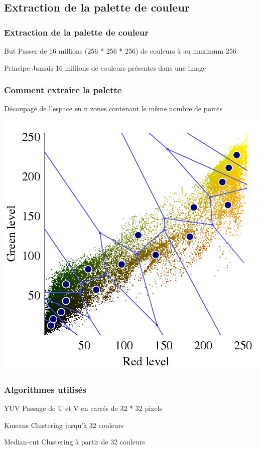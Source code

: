 \documentclass{beamer}
\begin{document}
\subsection{Extraction de la palette de couleur}
\begin{frame}
  \frametitle{Extraction de la palette de couleur}
  \begin{block}{But}
    Passer de 16 millions (256 * 256 * 256) de couleurs à au maximum 256
  \end{block}
  \begin{block}{Principe}
    Jamais 16 millions de couleurs présentes dans une image
  \end{block}
\end{frame}
\begin{frame}
  \frametitle{Comment extraire la palette}
  \begin{block}{}
    Découpage de l'espace en n zones contenant le même nombre de points
  \end{block}
  \begin{center}
    \includegraphics[scale=0.2]{cluster.png}
  \end{center}
\end{frame}
\begin{frame}
  \frametitle{Algorithmes utilisés}
  \begin{block}{YUV}
    Passage de U et V en carrés de 32 * 32 pixels
  \end{block}
  \begin{block}{Kmeans}
    Clustering jusqu'à 32 couleurs
  \end{block}
  \begin{block}{Median-cut}
    Clustering à partir de 32 couleurs
  \end{block}
\end{frame}
\end{document}
